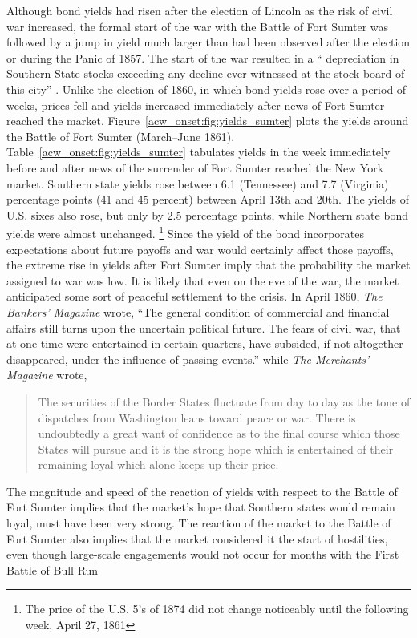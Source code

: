 Although bond yields had risen after the election of Lincoln as the risk of civil war increased, the formal start of the war with the Battle of Fort Sumter was followed by a jump in yield much larger than had been observed after the election or during the Panic of 1857.
The start of the war resulted in a `` depreciation in Southern State stocks exceeding any decline ever witnessed at the stock board of this city'' \parencite[919]{BankersMagazine1860}.
Unlike the election of 1860, in which bond yields rose over a period of weeks, prices fell and yields increased immediately after news of Fort Sumter reached the market.
Figure~\ref{acw_onset:fig:yields_sumter} plots the yields around the Battle of Fort Sumter (March--June 1861).
Table~\ref{acw_onset:fig:yields_sumter} tabulates yields in the week immediately before and after news of the surrender of Fort Sumter reached the New York market.
Southern state yields rose between 6.1 (Tennessee) and 7.7 (Virginia) percentage points (41 and 45 percent) between April 13th and 20th.
The yields of U.S. sixes also rose, but only by 2.5 percentage points,
while Northern state bond yields were almost unchanged.%
\footnote{The price of the U.S. 5's of 1874 did not change noticeably until the following week, April 27, 1861}
Since the yield of the bond incorporates expectations about future payoffs and war would certainly affect those payoffs, the extreme rise in yields after Fort Sumter imply that the probability the market assigned to war was low.
It is likely that even on the eve of the war, the market anticipated some sort of peaceful settlement to the crisis.
In April 1860, \textit{The Bankers' Magazine} wrote, ``The general condition of commercial and financial affairs still turns upon the uncertain political future. The fears of civil war, that at one time were entertained in certain quarters, have subsided, if not altogether disappeared, under the influence of passing events.'' \parencite[413]{HomansDana1861a}
while \textit{The Merchants' Magazine} wrote,
\begin{quotation}
  The securities of the Border States fluctuate from day to day as the tone of dispatches from Washington leans toward peace or war.
  There is undoubtedly a great want of confidence as to the final course which those States will pursue and it is the strong hope which is entertained of their remaining loyal which alone keeps up their price. \parencite[838]{BankersMagazine1860}
\end{quotation}
The magnitude and speed of the reaction of yields with respect to the Battle of Fort Sumter implies that the market's hope that Southern states would remain loyal, must have been very strong.
The reaction of the market to the Battle of Fort Sumter also implies that the market considered it the start of hostilities, even though large-scale engagements would not occur for months with the First Battle of Bull Run

